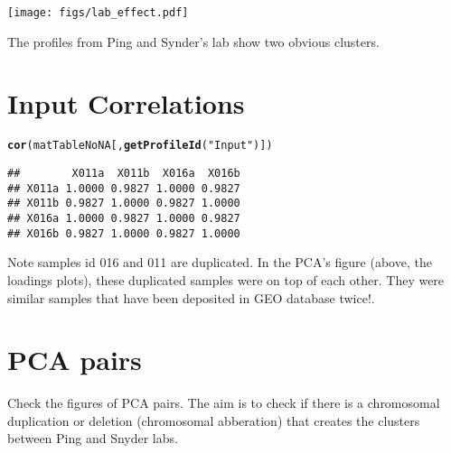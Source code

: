 \documentclass{article}\usepackage{graphicx, color}
\makeatletter
\newcommand{\hlfunctioncall}[1]{\textcolor[rgb]{0.501960784313725,0,0.329411764705882}{\textbf{#1}}}%
\newcommand{\hlstring}[1]{\textcolor[rgb]{0.6,0.6,1}{#1}}%
\newenvironment{kframe}{%
 \def\at@end@of@kframe{}%
 \ifinner\ifhmode%
  \def\at@end@of@kframe{\end{minipage}}%
  \begin{minipage}{\columnwidth}%
 \fi\fi%
 \def\FrameCommand##1{\hskip\@totalleftmargin \hskip-\fboxsep
 \colorbox{shadecolor}{##1}\hskip-\fboxsep
     \hskip-\linewidth \hskip-\@totalleftmargin \hskip\columnwidth}%
 \MakeFramed {\advance\hsize-\width
   \@totalleftmargin\z@ \linewidth\hsize
   \@setminipage}}%
 {\par\unskip\endMakeFramed%
 \at@end@of@kframe}
\newenvironment{knitrout}{}{} %
\makeatother
\begin{document}
\begin{figure*}
  \texttt{[image: figs/lab\_effect.pdf]}
\end{figure*}
The profiles from Ping and Synder's lab show two obvious clusters. 

\pagebreak

\section{Input Correlations}
\begin{knitrout}
\color{fgcolor}\begin{kframe}
\begin{alltt}
\hlfunctioncall{cor}(matTableNoNA[, \hlfunctioncall{getProfileId}(\hlstring{"Input"})])
\end{alltt}
\begin{verbatim}
##        X011a  X011b  X016a  X016b
## X011a 1.0000 0.9827 1.0000 0.9827
## X011b 0.9827 1.0000 0.9827 1.0000
## X016a 1.0000 0.9827 1.0000 0.9827
## X016b 0.9827 1.0000 0.9827 1.0000
\end{verbatim}
\end{kframe}
\end{knitrout}


Note samples id 016 and 011 are duplicated. In the PCA's figure (above, the loadings plots), these duplicated samples were on top of each other. They were similar samples that have been deposited in GEO database twice!.

\section{PCA pairs}
Check the figures of PCA pairs. The aim is to check if there is a chromosomal duplication or deletion (chromosomal abberation) that creates the clusters between Ping and Snyder labs. 
\end{document}
